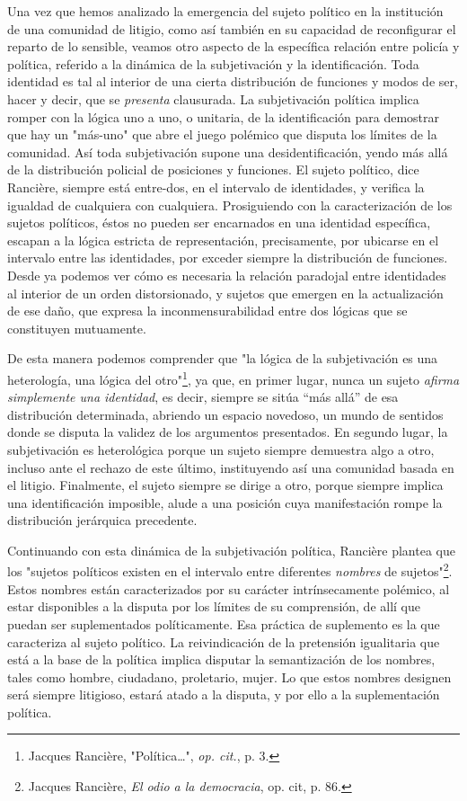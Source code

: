 \documentclass{book}
\begin{document}
Una vez que hemos analizado la emergencia del sujeto político en la
institución de una comunidad de litigio, como así también en su
capacidad de reconfigurar el reparto de lo sensible, veamos otro aspecto
de la específica relación entre policía y política, referido a la
dinámica de la subjetivación y la identificación. Toda identidad es tal
al interior de una cierta distribución de funciones y modos de ser,
hacer y decir, que se \emph{presenta} clausurada. La subjetivación
política implica romper con la lógica uno a uno, o unitaria, de la
identificación para demostrar que hay un "más-uno" que abre el juego
polémico que disputa los límites de la comunidad. Así toda subjetivación
supone una desidentificación, yendo más allá de la distribución policial
de posiciones y funciones. El sujeto político, dice Rancière, siempre
está entre-dos, en el intervalo de identidades, y verifica la igualdad
de cualquiera con cualquiera. Prosiguiendo con la caracterización de los
sujetos políticos, éstos no pueden ser encarnados en una identidad
específica, escapan a la lógica estricta de representación,
precisamente, por ubicarse en el intervalo entre las identidades, por
exceder siempre la distribución de funciones. Desde ya podemos ver cómo
es necesaria la relación paradojal entre identidades al interior de un
orden distorsionado, y sujetos que emergen en la actualización de ese
daño, que expresa la inconmensurabilidad entre dos lógicas que se
constituyen mutuamente.

De esta manera podemos comprender que "la lógica de la subjetivación es
una heterología, una lógica del otro"\footnote{Jacques Rancière,
  "Política\ldots", \emph{op. cit.}, p. 3.}, ya que, en primer lugar,
nunca un sujeto \emph{afirma simplemente una identidad}, es decir,
siempre se sitúa ``más allá'' de esa distribución determinada, abriendo
un espacio novedoso, un mundo de sentidos donde se disputa la validez de
los argumentos presentados. En segundo lugar, la subjetivación es
heterológica porque un sujeto siempre demuestra algo a otro, incluso
ante el rechazo de este último, instituyendo así una comunidad basada en
el litigio. Finalmente, el sujeto siempre se dirige a otro, porque
siempre implica una identificación imposible, alude a una posición cuya
manifestación rompe la distribución jerárquica precedente.

Continuando con esta dinámica de la subjetivación política, Rancière
plantea que los "sujetos políticos existen en el intervalo entre
diferentes \emph{nombres} de sujetos"\footnote{Jacques Rancière,
  \emph{El odio a la democracia}, op. cit, p. 86.}. Estos nombres están
caracterizados por su carácter intrínsecamente polémico, al estar
disponibles a la disputa por los límites de su comprensión, de allí que
puedan ser suplementados políticamente. Esa práctica de suplemento es la
que caracteriza al sujeto político. La reivindicación de la pretensión
igualitaria que está a la base de la política implica disputar la
semantización de los nombres, tales como hombre, ciudadano, proletario,
mujer. Lo que estos nombres designen será siempre litigioso, estará
atado a la disputa, y por ello a la suplementación política.
\end{document}
